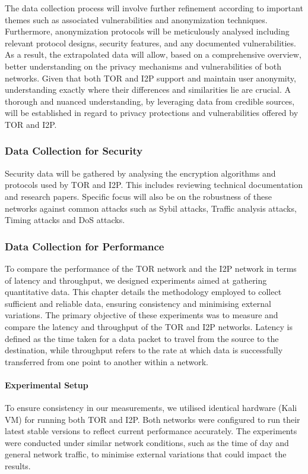 \documentclass[12pt,conference]{IEEEtran}
\begin{document}
The data collection process will involve further refinement according to important themes such as associated vulnerabilities and anonymization techniques. Furthermore, anonymization protocols will be meticulously analysed including relevant protocol designs, security features, and any documented vulnerabilities. As a result, the extrapolated data will allow, based on a comprehensive overview, better understanding on the privacy mechanisms and vulnerabilities of both networks. Given that both TOR and I2P support and maintain user anonymity, understanding exactly where their differences and similarities lie are crucial. A thorough and nuanced understanding, by leveraging data from credible sources, will be established in regard to privacy protections and vulnerabilities offered by TOR and I2P. 
\subsubsection{Data Collection for Security}
Security data will be gathered by analysing the encryption algorithms and protocols used by TOR and I2P. This includes reviewing technical documentation and research papers. Specific focus will also be on the robustness of these networks against common attacks such as Sybil attacks, Traffic analysis attacks, Timing attacks and DoS attacks.
\subsubsection{Data Collection for Performance}
To compare the performance of the TOR network and the I2P network in terms of latency and throughput, we designed experiments aimed at gathering quantitative data. This chapter details the methodology employed to collect sufficient and reliable data, ensuring consistency and minimising external variations. The primary objective of these experiments was to measure and compare the latency and throughput of the TOR and I2P networks. Latency is defined as the time taken for a data packet to travel from the source to the destination, while throughput refers to the rate at which data is successfully transferred from one point to another within a network. 
\paragraph{Experimental Setup}
To ensure consistency in our measurements, we utilised identical hardware (Kali VM) for running both TOR and I2P. Both networks were configured to run their latest stable versions to reflect current performance accurately. The experiments were conducted under similar network conditions, such as the time of day and general network traffic, to minimise external variations that could impact the results.
\end{document}
